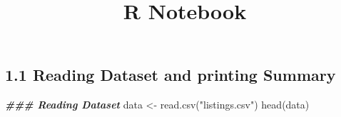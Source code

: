 \documentclass[
]{article}
\title{R Notebook}
\author{}
\date{\vspace{-2.5em}}
\newenvironment{Shaded}{\begin{snugshade}}{\end{snugshade}}
\newcommand{\DocumentationTok}[1]{\textcolor[rgb]{0.56,0.35,0.01}{\textbf{\textit{#1}}}}
\newcommand{\FunctionTok}[1]{\textcolor[rgb]{0.00,0.00,0.00}{#1}}
\newcommand{\NormalTok}[1]{#1}
\newcommand{\OtherTok}[1]{\textcolor[rgb]{0.56,0.35,0.01}{#1}}
\newcommand{\StringTok}[1]{\textcolor[rgb]{0.31,0.60,0.02}{#1}}
\begin{document}
\maketitle

\hypertarget{reading-dataset-and-printing-summary}{%
\subsection{1.1 Reading Dataset and printing
Summary}\label{reading-dataset-and-printing-summary}}

\begin{Shaded}
\begin{Highlighting}[]
\DocumentationTok{\#\#\# Reading Dataset}
\NormalTok{data }\OtherTok{\textless{}{-}} \FunctionTok{read.csv}\NormalTok{(}\StringTok{"listings.csv"}\NormalTok{)}
\FunctionTok{head}\NormalTok{(data)}
\end{Highlighting}
\end{Shaded}
\end{document}
